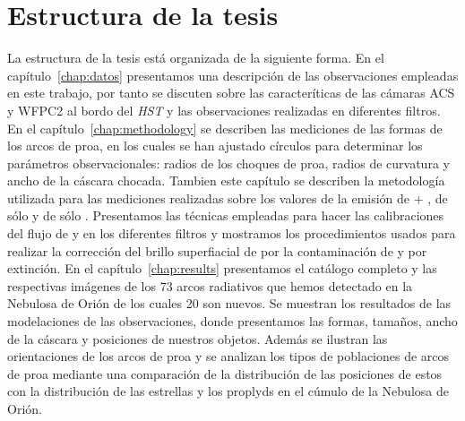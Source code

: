 \section{Estructura de la tesis}
\label{sec:estructura}

La estructura de la tesis está organizada de la siguiente forma. En el capítulo~\ref{chap:datos} presentamos una descripción de las observaciones empleadas en este trabajo, por tanto se discuten sobre las caracteríticas de las cámaras ACS y WFPC2 al bordo del \textit{HST} y las observaciones realizadas en diferentes filtros. En el capítulo~\ref{chap:methodology} se describen las mediciones de las formas de los arcos de proa, en los cuales se han ajustado círculos para determinar los parámetros observacionales: radios de los choques de proa, radios de curvatura y ancho de la cáscara chocada. Tambien este capítulo se describen la metodología utilizada para las mediciones realizadas sobre los valores de la emisión de \ha{} + \nii{}, de sólo \ha{} y de sólo \nii{}. Presentamos las técnicas empleadas para hacer las calibraciones del flujo de \ha{} y \nii{} en los diferentes filtros y mostramos los procedimientos usados para realizar la corrección del brillo superfiacial de \ha{} por la contaminación de \nii{} y por extinción. En el capítulo~\ref{chap:results} presentamos el catálogo completo y las respectivas imágenes de los 73 arcos radiativos que hemos detectado en la Nebulosa de Orión de los cuales 20 son nuevos. Se muestran los resultados de las modelaciones de las observaciones, donde  presentamos las formas, tamaños, ancho de la cáscara y posiciones de nuestros objetos. Además se ilustran las orientaciones de los arcos de proa y se analizan los tipos de poblaciones de arcos de proa mediante una comparación de la distribución de las posiciones de estos con la distribución de las estrellas y los proplyds en el cúmulo de la Nebulosa de Orión.\\

